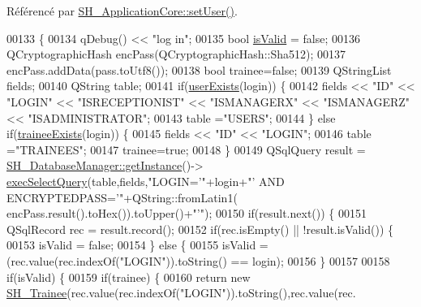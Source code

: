 Référencé par \hyperlink{classSH__ApplicationCore_a83d2df40550a95586e70a08833dc5e5f}{S\-H\-\_\-\-Application\-Core\-::set\-User()}.


\begin{DoxyCode}
00133 \{
00134     qDebug() << \textcolor{stringliteral}{"log in"};
00135     \textcolor{keywordtype}{bool} \hyperlink{classSH__User_aa1b7fd66632c13905f3b6fd941505c02}{isValid} = \textcolor{keyword}{false};
00136     QCryptographicHash encPass(QCryptographicHash::Sha512);
00137     encPass.addData(pass.toUtf8());
00138     \textcolor{keywordtype}{bool} trainee=\textcolor{keyword}{false};
00139     QStringList fields;
00140     QString table;
00141     \textcolor{keywordflow}{if}(\hyperlink{classSH__User_a5ca23c3c396d8867d5d605d087efb82f}{userExists}(login)) \{
00142         fields << \textcolor{stringliteral}{"ID"} << \textcolor{stringliteral}{"LOGIN"} << \textcolor{stringliteral}{"ISRECEPTIONIST"} << \textcolor{stringliteral}{"ISMANAGERX"} << \textcolor{stringliteral}{"ISMANAGERZ"} << \textcolor{stringliteral}{"ISADMINISTRATOR"};
00143         table =\textcolor{stringliteral}{"USERS"};
00144     \} \textcolor{keywordflow}{else} \textcolor{keywordflow}{if}(\hyperlink{classSH__User_af40edc91cf1a4d8065fb43d2899c3dcb}{traineeExists}(login)) \{
00145         fields << \textcolor{stringliteral}{"ID"} << \textcolor{stringliteral}{"LOGIN"};
00146         table =\textcolor{stringliteral}{"TRAINEES"};
00147         trainee=\textcolor{keyword}{true};
00148     \}
00149     QSqlQuery result = \hyperlink{classSH__DatabaseManager_a638369a15265ab0aa053080a32d2ca39}{SH\_DatabaseManager::getInstance}()->
      \hyperlink{classSH__DatabaseManager_ab8f9850cb68444ab9a4e613b36a3b044}{execSelectQuery}(table,fields,\textcolor{stringliteral}{"LOGIN='"}+login+\textcolor{stringliteral}{"' AND ENCRYPTEDPASS='"}+QString::fromLatin1(
      encPass.result().toHex()).toUpper()+\textcolor{stringliteral}{"'"});
00150     \textcolor{keywordflow}{if}(result.next()) \{
00151         QSqlRecord rec = result.record();
00152         \textcolor{keywordflow}{if}(rec.isEmpty() || !result.isValid()) \{
00153             isValid = \textcolor{keyword}{false};
00154         \} \textcolor{keywordflow}{else} \{
00155             isValid = (rec.value(rec.indexOf(\textcolor{stringliteral}{"LOGIN"})).toString() == login);
00156         \}
00157 
00158         \textcolor{keywordflow}{if}(isValid) \{
00159             \textcolor{keywordflow}{if}(trainee) \{
00160                 \textcolor{keywordflow}{return} \textcolor{keyword}{new} \hyperlink{classSH__Trainee}{SH\_Trainee}(rec.value(rec.indexOf(\textcolor{stringliteral}{"LOGIN"})).toString(),rec.value(rec.

\end{DoxyCode}
